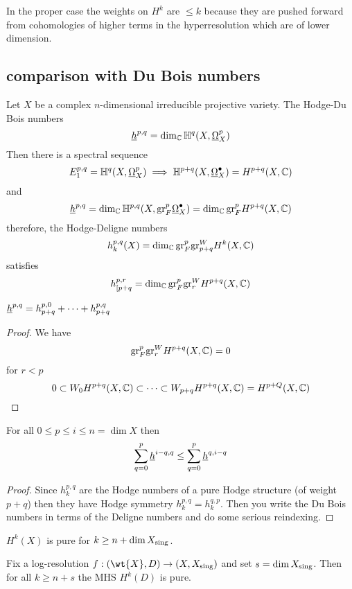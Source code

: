 \documentclass[12pt]{article}
\newcommand{\HH}{\mathbb{H}}
\renewcommand{\gr}{\mathrm{gr}}
\begin{document}
In the proper case the weights on $H^k$ are $\le k$ because they are pushed forward from cohomologies of higher terms in the hyperresolution which are of lower dimension.

\subsection{comparison with Du Bois numbers}

Let $X$ be a complex $n$-dimensional irreducible projective variety. The Hodge-Du Bois numbers
\[ \ul{h}^{p,q} = \dim_{\CC} \HH^q(X, \ulO_X^p) \]
Then there is a spectral sequence
\[ E^{p,q}_1 = \HH^q(X, \ulO_X^p) \implies \HH^{p+q}(X, \ulO_X^\bullet) = H^{p+q}(X, \CC) \]
and
\[ \ul{h}^{p,q} = \dim_{\CC} \HH^{p,q}(X, \gr^p_F \ulO_X^\bullet) = \dim_{\CC} \gr_F^p H^{p+q}(X, \CC) \]
therefore, the Hodge-Deligne numbers 
\[ h^{p,q}_k(X) = \dim_{\CC} \gr^p_F \gr_{p+q}^W H^k(X, \CC) \]
satisfies
\[ h^{p,r}_{[p+q} = \dim_{\CC} \gr_F^p \gr_r^W H^{p+q}(X, \CC) \]

\begin{cor}
$\underline{h}^{p,q} = h^{p,0}_{p+q} + \cdots + h^{p,q}_{p+q}$
\end{cor}

\begin{proof}
We have 
\[ \gr^p_F \gr_r^{W} H^{p+q}(X, \CC) = 0 \]
for $r < p$ 
\[ 0 \subset W_0 H^{p+q}(X, \mathbb{C}) \subset \cdots \subset W_{p+q} H^{p+q}(X, \mathbb{C}) = H^{p+Q}(X, \mathbb{C}) \]
\end{proof}

\begin{cor}
For all $0 \le p \le i \le n = \dim{X}$ then
\[ \sum_{q = 0}^p \underline{h}^{i-q,q} \le \sum_{q = 0}^p \underline{h}^{q,i-q} \] 
\end{cor}

\begin{proof}
Since $h^{p,q}_k$ are the Hodge numbers of a pure Hodge structure (of weight $p+q$) then they have Hodge symmetry $h^{p,q}_k = h^{q,p}_k$. Then you write the Du Bois numbers in terms of the Deligne numbers and do some serious reindexing. 
\end{proof}

\begin{theorem}
$H^k(X)$ is pure for $k \ge n + \dim{X_{\mathrm{sing}}}$.
\end{theorem}

\begin{lemma}
Fix a log-resolution $f : (\wt{X}, D) \to (X, X_{\sing})$ and set $s = \dim{X_{\mathrm{sing}}}$. Then for all $k \ge n + s$ the MHS $H^k(D)$ is pure.
\end{lemma}
\end{document}
